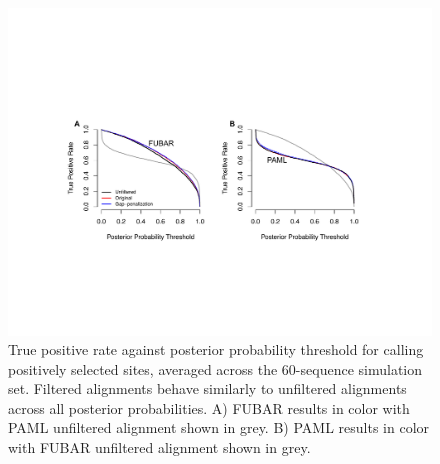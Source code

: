 \documentclass[11pt]{article}
\begin{document}
\begin{figure}[H]
\centerline{\includegraphics[width=5in]{Figures/fulltpr.pdf}}
\caption{\label{fulltpr} True positive rate against posterior probability threshold for calling positively selected sites, averaged across the 60-sequence simulation set. Filtered alignments behave similarly to unfiltered alignments across all posterior probabilities. A) FUBAR results in color with PAML unfiltered alignment shown in grey. B) PAML results in color with FUBAR unfiltered alignment shown in grey. }
\end{figure}

\newpage
\end{document}
